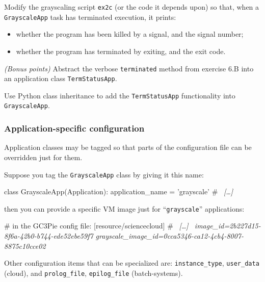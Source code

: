 \documentclass[english,serif,mathserif,xcolor=pdftex,dvipsnames,table]{beamer}
\begin{document}
\begin{frame}
  \begin{exercise*}[6.B]

    Modify the grayscaling script \texttt{ex2c} (or the code it
    depends upon) so that, when a \texttt{GrayscaleApp} task has
    terminated execution, it prints:
    \begin{itemize}
    \item whether the program has been killed by a signal, and the signal number;
    \item whether the program has terminated by exiting, and the exit code.
    \end{itemize}
  \end{exercise*}
\end{frame}


\begin{frame}
  \begin{exercise*}[6.B+] \emph{(Bonus points)} Abstract the verbose
    \texttt{terminated} method from exercise 6.B into an application
    class \texttt{TermStatusApp}.

    \+
    Use Python class inheritance to add the \texttt{TermStatusApp}
    functionality into \texttt{GrayscaleApp}.
  \end{exercise*}
\end{frame}


\begin{frame}[fragile]\small
  \frametitle{Application-specific configuration}

  Application classes may be tagged so that parts of the configuration
  file can be overridden just for them.

  \+
  Suppose you tag the \texttt{GrayscaleApp} class by giving it this name:
\begin{python}
  class GrayscaleApp(Application):
    application_name = 'grayscale'
    # ~\itshape [\ldots]~
\end{python}
  then you can provide a specific VM image just for
  ``\texttt{grayscale}'' applications:
  \begin{stdout}
  # in the GC3Pie config file:
  [resource/sciencecloud]
  # ~\itshape [\ldots]~
  image_id=2b227d15-8f6a-42b0-b744-ede52ebe59f7
  grayscale_image_id=0cca5346-ca12-4cb4-8007-8875c10cce02
  \end{stdout}

  \+ Other configuration items that can be specialized are:
  \lstinline|instance_type|, \lstinline|user_data| (cloud),
  and \lstinline|prolog_file|, \lstinline|epilog_file|
  (batch-systems).
\end{frame}
\end{document}
